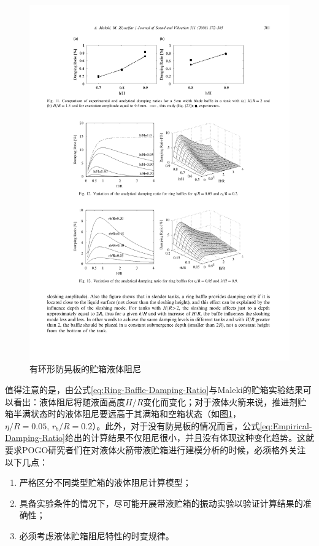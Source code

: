 \begin{figure}[!htb]
  \centering
  \includegraphics[width=\linewidth]{Ring-Baffle-Damping-Curve.pdf}
  \caption{有环形防晃板的贮箱液体阻尼}\label{Ring-Baffle-Damping-Curve}
\end{figure}

值得注意的是，由公式\eqref{eq:Ring-Baffle-Damping-Ratio}与Maleki的贮箱实验结果可以看出：液体阻尼将随液面高度$H/R$变化而变化；对于液体火箭来说，推进剂贮箱半满状态时的液体阻尼要远高于其满箱和空箱状态（如图\ref{Ring-Baffle-Damping-Curve}\cite{Maleki:2008}，$\eta/R=0.05,\, r_b/R=0.2$）。此外，对于没有防晃板的情况而言，公式\eqref{eq:Empirical-Damping-Ratio}给出的计算结果不仅阻尼很小，并且没有体现这种变化趋势。这就要求POGO研究者们在对液体火箭带液贮箱进行建模分析的时候，必须格外关注以下几点：
\begin{enumerate}
	\item 严格区分不同类型贮箱的液体阻尼计算模型；
	\item 具备实验条件的情况下，尽可能开展带液贮箱的振动实验以验证计算结果的准确性；
	\item 必须考虑液体贮箱阻尼特性的时变规律。
\end{enumerate}

